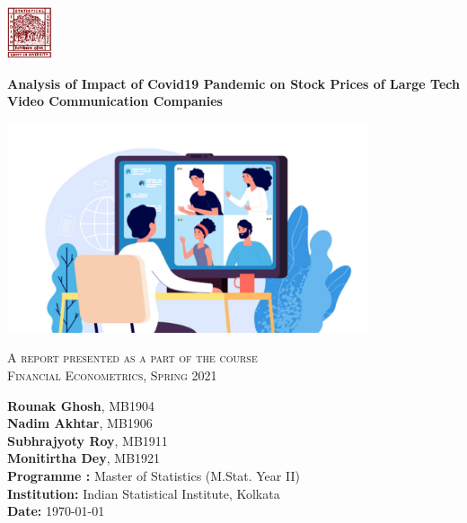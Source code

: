 \documentclass[11pt, a4paper]{article}
\begin{document}

\begingroup
\begin{titlepage}
    \begin{flushright}
           \includegraphics[width=0.1\textwidth]{isi-logo.png}
    \end{flushright}
   \begin{center}
    \vspace*{2.5cm}
       \textbf{\LARGE Analysis of Impact of Covid19 Pandemic on Stock Prices of Large Tech Video Communication Companies}
       
       \includegraphics[width=0.8\textwidth]{video-conferencing-statistics.jpeg}
 
       \vspace{1.5cm}
 
       \textsc{\Large A report presented as a part of the course\\ Financial Econometrics, Spring 2021}
 
       \vspace{0.8cm}
        
        \large
        \textbf{Rounak Ghosh}, MB1904\\
        \textbf{Nadim Akhtar}, MB1906\\
        \textbf{Subhrajyoty Roy}, MB1911\\
        \textbf{Monitirtha Dey}, MB1921\\
        

        \vspace{1cm}
       \textbf{Programme :} Master of Statistics (M.Stat. Year II)\\
       \textbf{Institution: } Indian Statistical Institute, Kolkata\\
       \textbf{Date: } \today
       
   \end{center}
\end{titlepage}
\endgroup
\end{document}
